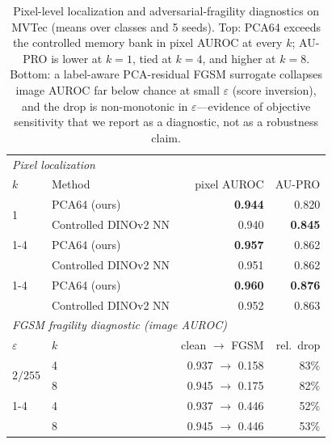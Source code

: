 \begin{table}[pos=t]
\centering
\caption{Pixel-level localization and adversarial-fragility diagnostics on MVTec (means over classes and 5 seeds). Top: PCA64 exceeds the controlled memory bank in pixel AUROC at every $k$; AU-PRO is lower at $k=1$, tied at $k=4$, and higher at $k=8$. Bottom: a label-aware PCA-residual FGSM surrogate collapses image AUROC far below chance at small $\varepsilon$ (score inversion), and the drop is non-monotonic in $\varepsilon$---evidence of objective sensitivity that we report as a diagnostic, not as a robustness claim.}
\label{tab:pixel-diagnostics}
\footnotesize
\setlength{\tabcolsep}{4pt}
\begin{tabular}{llrr}
\toprule
\multicolumn{4}{l}{\emph{Pixel localization}} \\
$k$ & Method & pixel AUROC & AU-PRO \\
\midrule
\multirow{2}{*}{1} & PCA64 (ours) & \textbf{0.944} & 0.820 \\
  & Controlled DINOv2 NN & 0.940 & \textbf{0.845} \\
\cmidrule(lr){1-4}
\multirow{2}{*}{4} & PCA64 (ours) & \textbf{0.957} & 0.862 \\
  & Controlled DINOv2 NN & 0.951 & 0.862 \\
\cmidrule(lr){1-4}
\multirow{2}{*}{8} & PCA64 (ours) & \textbf{0.960} & \textbf{0.876} \\
  & Controlled DINOv2 NN & 0.952 & 0.863 \\
\midrule
\multicolumn{4}{l}{\emph{FGSM fragility diagnostic (image AUROC)}} \\
$\varepsilon$ & $k$ & clean $\to$ FGSM & rel.\ drop \\
\midrule
\multirow{2}{*}{$2/255$} & 4 & 0.937 $\to$ 0.158 & 83\% \\
        & 8 & 0.945 $\to$ 0.175 & 82\% \\
\cmidrule(lr){1-4}
\multirow{2}{*}{$8/255$} & 4 & 0.937 $\to$ 0.446 & 52\% \\
        & 8 & 0.945 $\to$ 0.446 & 53\% \\
\bottomrule
\end{tabular}
\end{table}
